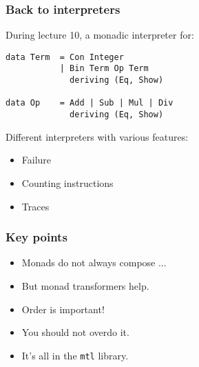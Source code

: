 \documentclass[pdftex,aspectratio=169]{beamer}
\begin{document}
\begin{frame}[fragile]
  \frametitle{Back to interpreters}

  \begin{block}{During lecture 10, a monadic interpreter for:}
    \begin{lstlisting}
data Term  = Con Integer
           | Bin Term Op Term
             deriving (Eq, Show)

data Op    = Add | Sub | Mul | Div
             deriving (Eq, Show)
    \end{lstlisting}
  \end{block}
  \pause
  Different interpreters with various features:
  \begin{itemize}
  \item Failure
  \item Counting instructions
  \item Traces
  \end{itemize}
\end{frame}


\begin{frame}
  \frametitle{Key points}
  \begin{itemize}[<+->]
  \item Monads do not always compose ...
  \item But monad transformers help.
  \item Order is important!
  \item You should not overdo it.
  \item It's all in the \lstinline{mtl} library.
  \end{itemize}
\end{frame}
\end{document}

